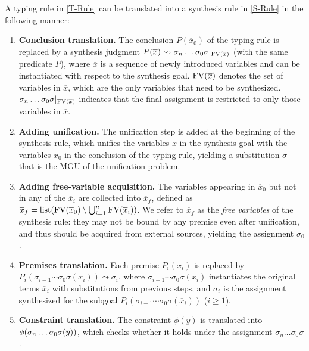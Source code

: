 A typing rule in \autoref{T-Rule} can be translated into a synthesis rule in \autoref{S-Rule} in the following manner:
\begin{enumerate}
  \item \textbf{Conclusion translation.} The conclusion $P(\overline{x}_0)$ of the typing rule is replaced by a synthesis judgment $P(\overline{x}) \leadsto \sigma_n \ldots \sigma_0 \sigma|_{\text{FV}(\overline{x})}$ (with the same predicate $P$), where $\overline{x}$ is a sequence of newly introduced variables and can be instantiated with respect to the synthesis goal. $\text{FV}(\overline{x})$ denotes the set of variables in $\overline{x}$, which are the only variables that need to be synthesized. 
  $\sigma_n \ldots \sigma_0 \sigma|_{\text{FV}(\overline{x})}$ indicates that the final assignment is restricted to only those variables in $\overline{x}$.

  \item \textbf{Adding unification.} The unification step is added at the beginning of the synthesis rule, which unifies the variables $\overline{x}$ in the synthesis goal with the variables $\overline{x}_0$ in the conclusion of the typing rule, yielding a substitution $\sigma$ that is the MGU of the unification problem. 
  
  \item \textbf{Adding free-variable acquisition.} The variables appearing in $\overline{x}_0$ but not in any of the $\overline{x}_i$ are collected into $\overline{x}_f$, defined as $\overline{x}_f = \text{list}(\text{FV}(\overline{x}_0) \setminus \bigcup_{i=1}^n \text{FV}(\overline{x}_i))$. We refer to $\overline{x}_f$ as the \emph{free variables} of the synthesis rule: they may not be bound by any premise even after unification, and thus should be acquired from external sources, yielding the assignment $\sigma_0$.
  
  \item \textbf{Premises translation.} Each premise $P_i(\overline{x}_i)$ is replaced by $P_i(\sigma_{i-1} \cdots \sigma_0 \sigma(\overline{x}_i)) \leadsto \sigma_i$, where $\sigma_{i-1} \cdots \sigma_0 \sigma(\overline{x}_i)$ instantiates the original terms $\overline{x}_i$ with substitutions from previous steps, and $\sigma_i$ is the assignment synthesized for the subgoal $P_i(\sigma_{i-1} \cdots \sigma_0 \sigma(\overline{x}_i))$ ($i\geq1$).
  
  \item \textbf{Constraint translation.} The constraint $\phi(\overline{y})$ is translated into $\phi(\sigma_n \ldots \sigma_0 \sigma(\overline{y}))$, which checks whether it holds under the assignment $\sigma_n \ldots \sigma_0 \sigma$.    
\end{enumerate}


